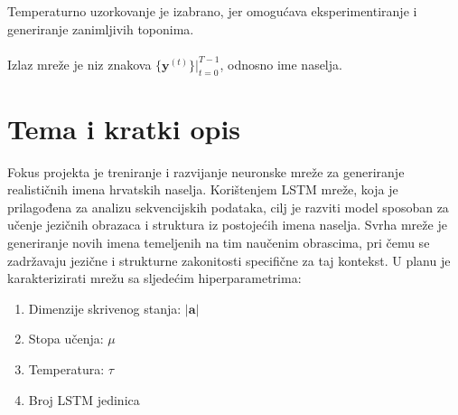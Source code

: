 \documentclass{report}
\begin{document}
Temperaturno uzorkovanje je izabrano, jer omogućava eksperimentiranje i generiranje zanimljivih toponima.\\
\\
Izlaz mreže je niz znakova $\{\mathbf{y}^{(t)}\} \biggr \rvert_{t=0}^{T-1}$, odnosno ime naselja.

\section{Tema i kratki opis}
Fokus projekta je treniranje i razvijanje neuronske mreže za generiranje realističnih imena hrvatskih naselja. Korištenjem LSTM mreže, koja je prilagođena za analizu sekvencijskih podataka, cilj je razviti model sposoban za učenje jezičnih obrazaca i struktura iz postojećih imena naselja. Svrha mreže je generiranje novih imena temeljenih na tim naučenim obrascima, pri čemu se zadržavaju jezične i strukturne zakonitosti specifične za taj kontekst. U planu je karakterizirati mrežu sa sljedećim hiperparametrima:
\begin{enumerate}
\item Dimenzije skrivenog stanja: $\lvert \mathbf{a} \rvert$
\item Stopa učenja: $\mu$
\item Temperatura: $\tau$
\item Broj LSTM jedinica
\end{enumerate}
\end{document}
